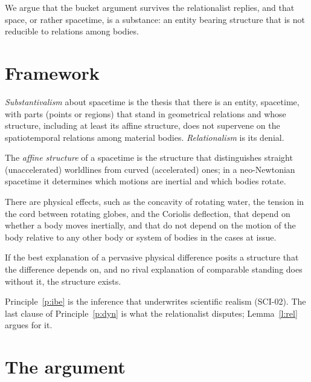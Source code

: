 \documentclass{situationist-preprint}
\begin{document}
We argue that the bucket argument survives the relationalist replies, and that space, or rather spacetime, is a substance: an entity bearing structure that is not reducible to relations among bodies.

\section{Framework}

\begin{definition}[Substantivalism]\label{d:subst}
\emph{Substantivalism} about spacetime is the thesis that there is an entity, spacetime, with parts (points or regions) that stand in geometrical relations and whose structure, including at least its affine structure, does not supervene on the spatiotemporal relations among material bodies. \emph{Relationalism} is its denial.
\end{definition}

\begin{definition}\label{d:affine}
The \emph{affine structure} of a spacetime is the structure that distinguishes straight (unaccelerated) worldlines from curved (accelerated) ones; in a neo-Newtonian spacetime it determines which motions are inertial and which bodies rotate.
\end{definition}

\begin{principle}\label{p:dyn}
There are physical effects, such as the concavity of rotating water, the tension in the cord between rotating globes, and the Coriolis deflection, that depend on whether a body moves inertially, and that do not depend on the motion of the body relative to any other body or system of bodies in the cases at issue.
\end{principle}

\begin{principle}\label{p:ibe}
If the best explanation of a pervasive physical difference posits a structure that the difference depends on, and no rival explanation of comparable standing does without it, the structure exists.
\end{principle}

Principle~\ref{p:ibe} is the inference that underwrites scientific realism (SCI-02). The last clause of Principle~\ref{p:dyn} is what the relationalist disputes; Lemma~\ref{l:rel} argues for it.

\section{The argument}
\end{document}
